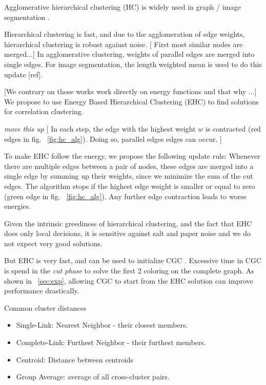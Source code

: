 \documentclass[10pt,twocolumn,letterpaper]{article}
\begin{document}
Agglomerative hierarchical clustering (HC) is widely used
in graph / image segmentation
\cite{arbelaez_2006}.







Hierarchical clustering is fast, and 
due to the agglomeration of edge weights, 
{\color{red} hierarchical clustering is robust against noise}.
{\color{yellow} [ First most similar nodes are merged...]
In agglomerative clustering, weights of
parallel edges are merged into single edges.}
For image segmentation, the length
weighted mean is used to do this update [ref].

[We contrary on those works work directly on energy functions and that why ...]
We propose to use Energy Based Hierarchical Clustering (EHC) to find
solutions for correlation clustering.

\textit{move this up} [ In each step, the edge with the highest weight $w$ is
contracted (red edges in fig. ~\ref{fig:hc_alg}).
Doing so, parallel edges edges can occur.
]

To make EHC follow the energy, we propose 
the following update rule:
Whenever there are multiple edges between 
a pair of nodes, these edges are merged into a single edge
by summing up their weights, since we 
minimize the sum of the cut edges.
The algorithm stops if the highest edge weight is
smaller or equal to zero  (green edge in fig. ~\ref{fig:hc_alg}). Any further edge
contraction leads to worse energies.

Given the intrinsic greediness of hierarchical clustering, 
and the fact that EHC does only local decisions, it is 
sensitive against salt and paper noise 
and we do not expect very good solutions.

But EHC is very fast, and can be used to initialize
CGC \cite{beier_2014_cvpr}. Excessive time in CGC
is spend in the \emph{cut phase} to solve the 
first 2 coloring on the complete graph.
As shown in ~\ref{sec:exp},
allowing CGC to start from the EHC solution
can improve performance drastically.



%


Common cluster distances
\begin{itemize}
\item Single-Link: Nearest Neighbor - their closest members.
\item Complete-Link: Furthest Neighbor - their furthest members.
\item Centroid: Distance between centroids
\item Group Average: average of all cross-cluster pairs.
\end{itemize}
\end{document}
